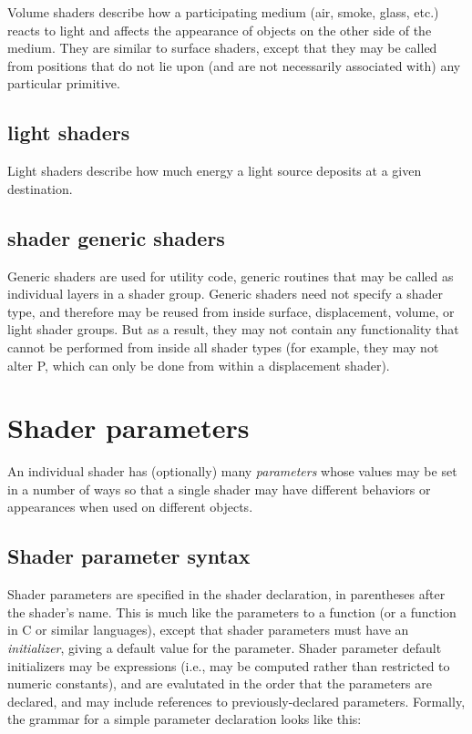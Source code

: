 \documentclass[11pt,letterpaper]{book}
\def\P{{\cf P}\xspace}
\begin{document}
Volume shaders describe how a participating medium (air, smoke, glass,
etc.) reacts to light and affects the appearance of objects on the other
side of the medium.  They are similar to {\cf surface} shaders, except
that they may be called from positions that do not lie upon (and are not
necessarily associated with) any particular primitive.

\subsection*{{\cf light} shaders}

Light shaders describe how much energy a light source deposits at a
given destination.

\subsection*{{\cf shader} generic shaders}

Generic shaders are used for utility code, generic routines that may be
called as individual layers in a shader group.  Generic shaders need not
specify a shader type, and therefore may be reused from inside surface,
displacement, volume, or light shader groups.  But as a result, they may
not contain any functionality that cannot be performed from inside all
shader types (for example, they may not alter \P, which can only be done
from within a displacement shader).


\section{Shader parameters}
\label{sec:shaderparams}
 

An individual shader has (optionally) many \emph{parameters} whose
values may be set in a number of ways so that a single shader may have
different behaviors or appearances when used on different objects.

\subsection{Shader parameter syntax}

Shader parameters are specified in the shader declaration, in
parentheses after the shader's name.  This is much like the parameters
to a \languagename function (or a function in C or similar languages),
except that shader parameters must have an \emph{initializer}, giving a
default value for the parameter.  Shader parameter default initializers
may be expressions (i.e., may be computed rather than restricted to
numeric constants), and are evalutated in the order that the parameters
are declared, and may include references to previously-declared
parameters.  Formally, the grammar for a simple parameter
declaration looks like this:
\end{document}
